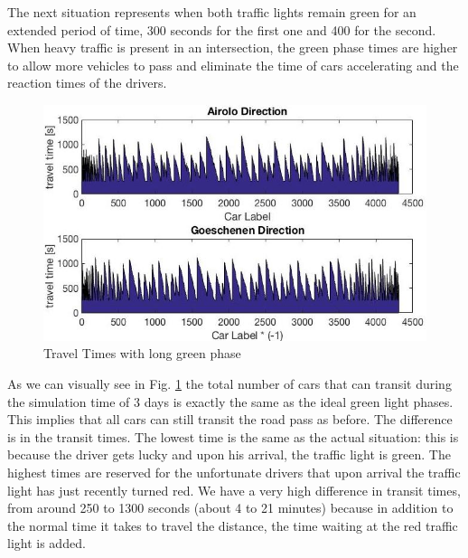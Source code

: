 \documentclass[11pt,a4paper,parskip=half-]{article}
\begin{document}
The next situation represents when both traffic lights remain green for an extended period of time, 300 seconds for the first one and 400 for the second. When heavy traffic is present in an intersection, the green phase times are higher to allow more vehicles to pass and eliminate the time of cars accelerating and the reaction times of the drivers.

\begin{figure}[h!]
\includegraphics[scale=0.65]{longtraveltimes}
\centering
\vspace*{-4mm}
\caption{Travel Times with long green phase}
\label{fig:traveltimes300_400}
\end{figure}

As we can visually see in Fig. \ref{fig:traveltimes300_400} the total number of cars that can transit during the simulation time of 3 days is exactly the same as the ideal green light phases. This implies that all cars can still transit the road pass as before. The difference is in the transit times. The lowest time is the same as the actual situation: this is because the driver gets lucky and upon his arrival, the traffic light is green. The highest times are reserved for the unfortunate drivers that upon arrival the traffic light has just recently turned red. We have a very high difference in transit times, from around 250 to 1300 seconds (about 4 to 21 minutes) because in addition to the normal time it takes to travel the distance, the time waiting at the red traffic light is added. 
\end{document}
